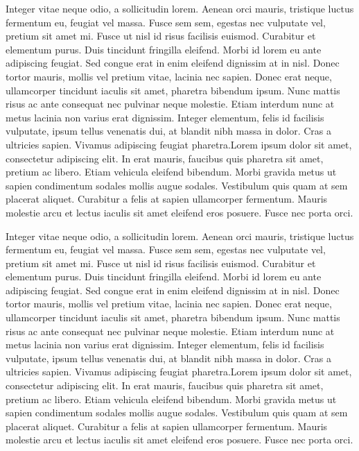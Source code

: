 Integer vitae neque odio, a sollicitudin lorem. Aenean orci mauris, tristique luctus fermentum eu, feugiat vel massa. Fusce sem sem, egestas nec vulputate vel, pretium sit amet mi. Fusce ut nisl id risus facilisis euismod. Curabitur et elementum purus. Duis tincidunt fringilla eleifend. Morbi id lorem eu ante adipiscing feugiat. Sed congue erat in enim eleifend dignissim at in nisl. Donec tortor mauris, mollis vel pretium vitae, lacinia nec sapien. Donec erat neque, ullamcorper tincidunt iaculis sit amet, pharetra bibendum ipsum. Nunc mattis risus ac ante consequat nec pulvinar neque molestie. Etiam interdum nunc at metus lacinia non varius erat dignissim. Integer elementum, felis id facilisis vulputate, ipsum tellus venenatis dui, at blandit nibh massa in dolor. Cras a ultricies sapien. Vivamus adipiscing feugiat pharetra.Lorem ipsum dolor sit amet, consectetur adipiscing elit. In erat mauris, faucibus quis pharetra sit amet, pretium ac libero. Etiam vehicula eleifend bibendum. Morbi gravida metus ut sapien condimentum sodales mollis augue sodales. Vestibulum quis quam at sem placerat aliquet. Curabitur a felis at sapien ullamcorper fermentum. Mauris molestie arcu et lectus iaculis sit amet eleifend eros posuere. Fusce nec porta orci.

Integer vitae neque odio, a sollicitudin lorem. Aenean orci mauris, tristique luctus fermentum eu, feugiat vel massa. Fusce sem sem, egestas nec vulputate vel, pretium sit amet mi. Fusce ut nisl id risus facilisis euismod. Curabitur et elementum purus. Duis tincidunt fringilla eleifend. Morbi id lorem eu ante adipiscing feugiat. Sed congue erat in enim eleifend dignissim at in nisl. Donec tortor mauris, mollis vel pretium vitae, lacinia nec sapien. Donec erat neque, ullamcorper tincidunt iaculis sit amet, pharetra bibendum ipsum. Nunc mattis risus ac ante consequat nec pulvinar neque molestie. Etiam interdum nunc at metus lacinia non varius erat dignissim. Integer elementum, felis id facilisis vulputate, ipsum tellus venenatis dui, at blandit nibh massa in dolor. Cras a ultricies sapien. Vivamus adipiscing feugiat pharetra.Lorem ipsum dolor sit amet, consectetur adipiscing elit. In erat mauris, faucibus quis pharetra sit amet, pretium ac libero. Etiam vehicula eleifend bibendum. Morbi gravida metus ut sapien condimentum sodales mollis augue sodales. Vestibulum quis quam at sem placerat aliquet. Curabitur a felis at sapien ullamcorper fermentum. Mauris molestie arcu et lectus iaculis sit amet eleifend eros posuere. Fusce nec porta orci.

